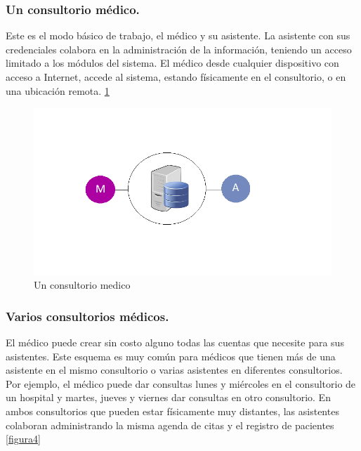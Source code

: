 \subsubsection{Un consultorio médico.}
Este es el modo básico de trabajo, el médico y su asistente. La asistente con sus credenciales colabora en la administración de la información, teniendo un acceso limitado a los módulos del sistema. El médico desde cualquier dispositivo con acceso a Internet, accede al sistema, estando físicamente en el consultorio, o en una ubicación remota.\cite{esquemas} \ref{figura3}
\begin{figure}[h]
  \label{figura3}
  \centering
  \includegraphics[scale=.35]{lib/assets/3}
  \caption{Un consultorio medico}
\end{figure}




\subsubsection{Varios consultorios médicos.}
El médico puede crear sin costo alguno todas las cuentas que necesite para sus asistentes. Este esquema es muy común para médicos que tienen más de una asistente en el mismo consultorio o varias asistentes en diferentes consultorios. Por ejemplo, el médico puede dar consultas lunes y miércoles en el consultorio de un hospital y martes, jueves y viernes dar consultas en otro consultorio. En ambos consultorios que pueden estar físicamente muy distantes, las asistentes colaboran administrando la misma agenda de citas y el registro de pacientes \cite{esquemas} \ref{figura4}

